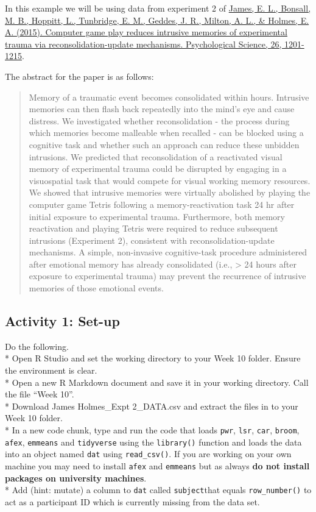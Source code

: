 \documentclass[]{book}
\begin{document}
In this example we will be using data from experiment 2 of \href{https://www.ncbi.nlm.nih.gov/pmc/articles/PMC4526368/}{James, E. L., Bonsall, M. B., Hoppitt, L., Tunbridge, E. M., Geddes, J. R., Milton, A. L., \& Holmes, E. A. (2015). Computer game play reduces intrusive memories of experimental trauma via reconsolidation-update mechanisms. Psychological Science, 26, 1201-1215}.

The abstract for the paper is as follows:

\begin{quote}
Memory of a traumatic event becomes consolidated within hours. Intrusive memories can then flash back repeatedly into the mind's eye and cause distress. We investigated whether reconsolidation - the process during which memories become malleable when recalled - can be blocked using a cognitive task and whether such an approach can reduce these unbidden intrusions. We predicted that reconsolidation of a reactivated visual memory of experimental trauma could be disrupted by engaging in a visuospatial task that would compete for visual working memory resources. We showed that intrusive memories were virtually abolished by playing the computer game Tetris following a memory-reactivation task 24 hr after initial exposure to experimental trauma. Furthermore, both memory reactivation and playing Tetris were required to reduce subsequent intrusions (Experiment 2), consistent with reconsolidation-update mechanisms. A simple, non-invasive cognitive-task procedure administered after emotional memory has already consolidated (i.e., \textgreater{} 24 hours after exposure to experimental trauma) may prevent the recurrence of intrusive memories of those emotional events.
\end{quote}

\hypertarget{activity-1-set-up-10}{%
\subsection{Activity 1: Set-up}\label{activity-1-set-up-10}}

Do the following.\\
* Open R Studio and set the working directory to your Week 10 folder. Ensure the environment is clear.\\
* Open a new R Markdown document and save it in your working directory. Call the file ``Week 10''.\\
* Download James Holmes\_Expt 2\_DATA.csv and extract the files in to your Week 10 folder.\\
* In a new code chunk, type and run the code that loads \texttt{pwr}, \texttt{lsr}, \texttt{car}, \texttt{broom}, \texttt{afex}, \texttt{emmeans} and \texttt{tidyverse} using the \texttt{library()} function and loads the data into an object named \texttt{dat} using \texttt{read\_csv()}. If you are working on your own machine you may need to install \texttt{afex} and \texttt{emmeans} but as always \textbf{do not install packages on university machines}.\\
* Add (hint: mutate) a column to \texttt{dat} called \texttt{subject}that equals \texttt{row\_number()} to act as a participant ID which is currently missing from the data set.
\end{document}
